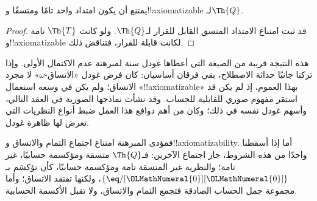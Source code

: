 \documentclass[../../../include/open-logic-section]{subfiles}
\begin{document}


\begin{thm}
يمتنع أن يكون امتداد واحد تامًا ومتسقًا و!!{axiomatizable}
لـ$\Th{Q}$.
\end{thm}

\begin{proof}
قد ثبت امتناع الامتداد المتسق القابل للقرار لـ$\Th{Q}$.
ولو كانت $\Th{T}$ تامة و!!{axiomatizable} لكانت قابلة للقرار،
فتناقض ذلك.
\end{proof}

\begin{explain}
هذه النتيجة قريبة من الصيغة التي أعطاها غودل سنة  لمبرهنة
عدم الاكتمال الأولى. وإذا تركنا جانبًا حداثة الاصطلاح، بقي فرقان
أساسيان: كان فرض غودل «الاتساق-$\omega$» لا مجرد الاتساق؛ ولم يكن
في وسعه استعمال «!!{axiomatizable}» بهذا العموم، إذ لم يكن قد
استقر مفهوم صوري للقابلية للحساب. وقد نشأت نماذجها الصورية في العقد
التالي، وأسهم غودل نفسه في ذلك؛ وكان من أهم دوافع هذا العمل ضبط
أنواع النظريات التي تعرض لها ظاهرة غودل.

فمؤدى المبرهنة امتناع اجتماع التمام والاتساق
و!!{axiomatizability}. أما إذا أسقطنا واحدًا من هذه الشروط، جاز
اجتماع الآخرين: فـ$\Th{Q}$ متسقة ومؤكسمة حسابيًا، غير تامة؛
والنظرية غير المتسقة تامة ومؤكسمة حسابيًا، كأن تؤكسَم بـ
$\{ \eq/[{\OLMathNumeral{0}}][{\OLMathNumeral{0}}] \}$، ولكنها تفتقد الاتساق؛ وأما مجموعة جمل الحساب
الصادقة فتجمع التمام والاتساق، ولا تقبل الأكسمة الحسابية.
\end{explain}
\end{document}
